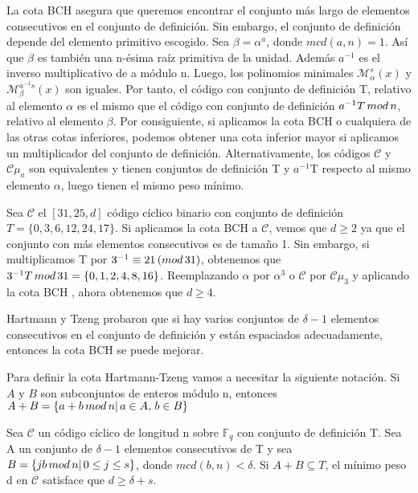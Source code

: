 La cota BCH asegura que queremos encontrar el conjunto más largo de elementos consecutivos en el conjunto de definición. Sin embargo, el conjunto de definición depende del elemento primitivo escogido. Sea $\beta = \alpha^a$, donde $mcd(a,n)=1$. Así que $\beta$ es también una n-ésima raíz primitiva de la unidad. Además $a^{-1}$ es el inverso multiplicativo de a módulo n. Luego, los polinomios minimales $\mathcal{M}_\alpha^s(x)$ y $\mathcal{M}_\beta^{a^{-1}s}(x)$ son iguales. Por tanto, el código con conjunto de definición T, relativo al elemento $\alpha$ es el mismo que el código con conjunto de definición $a^{-1}T \thinspace mod \thinspace n$, relativo al elemento $\beta$. Por consiguiente, si aplicamos la cota BCH o cualquiera de las otras cotas inferiores, podemos obtener una cota inferior mayor si aplicamos un multiplicador del conjunto de definición. Alternativamente, los códigos $\mathcal{C}$ y $\mathcal{C}\mu_a$ son equivalentes y tienen conjuntos de definición T y $a^{-1}$T respecto al mismo elemento $\alpha$, luego tienen el mismo peso mínimo.

\begin{exampleth}
Sea $\mathcal{C}$ el $[31,25,d]$ código cíclico binario con conjunto de definición $T = \{ 0,3,6,12,24,17 \}$. Si aplicamos la cota BCH a $\mathcal{C}$, vemos que $d \geq 2$ ya que el conjunto con más elementos consecutivos es de tamaño 1. Sin embargo, si multiplicamos T por $ 3^{-1} \equiv 21 \thinspace (mod \thinspace 31)$, obtenemos que $3^{-1}T \thinspace mod \thinspace 31 = \{ 0,1,2,4,8,16 \}$. Reemplazando $\alpha$ por $\alpha^3$ o $\mathcal{C}$ por $\mathcal{C}\mu_3$ y aplicando la cota BCH , ahora obtenemos que $ d \geq 4 $.
\end{exampleth}



Hartmann y Tzeng probaron que si hay varios conjuntos de $\delta -1$ elementos consecutivos en el conjunto de definición y están espaciados adecuadamente, entonces la cota BCH se puede mejorar.

Para definir la cota Hartmann-Tzeng vamos a necesitar la siguiente notación. Si $A$ y $B$ son subconjuntos de enteros módulo n, entonces $A+B = \{ a + b \thinspace mod \thinspace n | \thinspace a \in A, \thinspace b \in B \}$


\begin{theorem}
Sea $\mathcal{C}$ un código cíclico de longitud n sobre $\mathbb{F}_q$ con conjunto de definición T. Sea A un conjunto de $\delta -1$ elementos consecutivos de T y sea $B = \{ jb \thinspace mod \thinspace n |\thinspace 0\leq j \leq s \}$, donde $mcd(b,n) < \delta$. Si $A+B \subseteq T$, el mínimo peso d en $\mathcal{C}$ satisface que $ d \geq \delta + s$.

\end{theorem}

